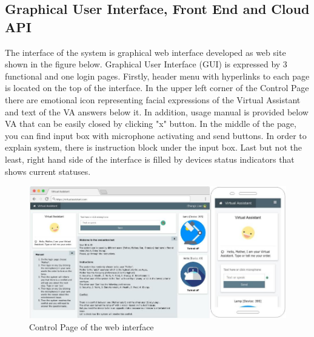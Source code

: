 \documentclass{llncs}
\begin{document}
    \subsection{Graphical User Interface, Front End and Cloud API}
    The interface of the system is graphical web interface developed as web site shown in the figure below.
    Graphical User Interface (GUI) is expressed by 3 functional and one login pages.
    Firstly, header menu with hyperlinks to each page is located on the top of the interface.
    In the upper left corner of the Control Page there are emotional icon representing facial expressions of the Virtual Assistant
    and text of the VA answers below it.
    In addition, usage manual is provided below VA that can be easily closed by clicking "x" button.
    In the middle of the page, you can find input box with microphone activating and send buttons.
    In order to explain system, there is instruction block under the input box.
    Last but not the least, right hand side of the interface is filled by devices status indicators that shows current statuses.
    \begin{figure} \centering \centering
        \includegraphics[trim=left botm right top, width=\textwidth, clip]{mockup.png}
        \caption[]{Control Page of the web interface}
    \end{figure}
    
\end{document}
